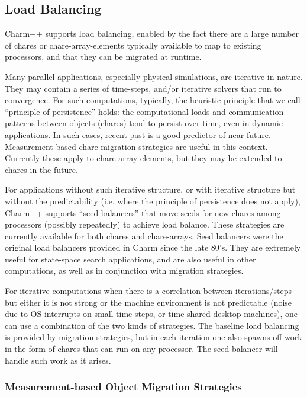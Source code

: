 
\subsection{Load Balancing}

\label{loadbalancing}


Charm++ supports load balancing, enabled by the fact there are a large
number of chares or chare-array-elements typically available to map to
existing processors, and that they can be migrated at runtime.

Many parallel applications, especially physical simulations, are
iterative in nature. They may contain a series of time-steps, and/or
iterative solvers that run to convergence. For such computations,
typically, the heuristic principle that we call ``principle of
persistence'' holds: the computational loads and communication patterns
between objects (chares) tend to persist over time, even in dynamic
applications. In such cases, recent past is a good predictor of near
future. Measurement-based chare migration strategies are useful in
this context. Currently these apply to chare-array elements, but they
may be extended to chares in the future.

For applications without such iterative structure, or with iterative structure
but without the predictability (i.e. where the principle of persistence does
not apply), Charm++ supports ``seed balancers'' that move seeds for new chares
among processors (possibly repeatedly) to achieve load balance. These
strategies are currently available for both chares and chare-arrays.  Seed
balancers were the original load balancers provided in Charm since the late
80's. They are extremely useful for state-space search applications, and are
also useful in other computations, as well as in conjunction with migration
strategies.

For iterative computations when there is a correlation between iterations/steps
but either it is not strong or the machine environment is not predictable
(noise due to OS interrupts on small time steps, or time-shared desktop
machines), one can use a combination of the two kinds of strategies. The
baseline load balancing is provided by migration strategies, but in each
iteration one also spawns off work in the form of chares that can run on any
processor. The seed balancer will handle such work as it arises.

\subsubsection{Measurement-based Object Migration Strategies}

